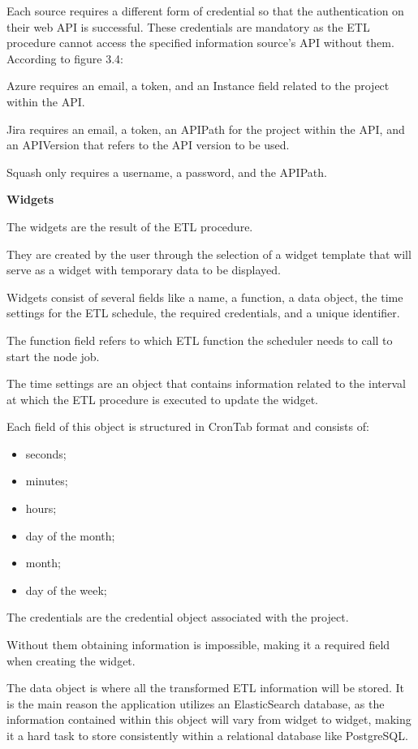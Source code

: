 \documentclass[a4paper,twoside,10pt]{report}
\begin{document}
Each source requires a different form of credential so that the authentication on their web API is successful. These credentials are mandatory as the ETL procedure cannot access the specified information source's API without them.
\newline
According to figure 3.4:
\newline

Azure requires an email, a token, and an Instance field related to the project within the API.

Jira requires an email, a token, an APIPath for the project within the API, and an APIVersion that refers to the API version to be used.

Squash only requires a username, a password, and the APIPath.

\newpage

\textbf{Widgets}

The widgets are the result of the ETL procedure.

They are created by the user through the selection of a widget template that will serve as a widget with temporary data to be displayed.

Widgets consist of several fields like a name, a function, a data object, the time settings for the ETL schedule, the required credentials, and a unique identifier.

The function field refers to which ETL function the scheduler needs to call to start the node job.

The time settings are an object that contains information related to the interval at which the ETL procedure is executed to update the widget. 

Each field of this object is structured in CronTab format and consists of:
\begin{itemize}
 \item seconds;
 \item minutes;
 \item hours;
 \item day of the month;
 \item month;
 \item day of the week;
\end{itemize}
The credentials are the credential object associated with the project.

Without them obtaining information is impossible, making it a required field when creating the widget.

The data object is where all the transformed ETL information will be stored. It is the main reason the application utilizes an ElasticSearch database, as the information contained within this object will vary from widget to widget, making it a hard task to store consistently within a relational database like PostgreSQL.
\end{document}
